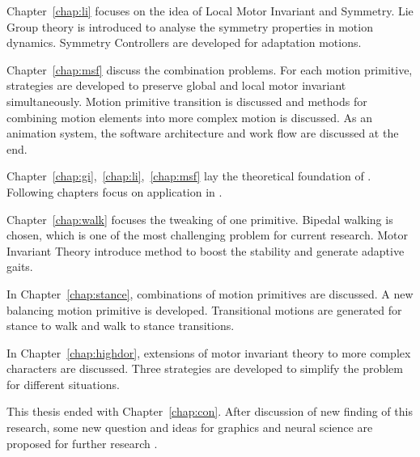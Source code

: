 Chapter~\ref{chap:li} focuses on the idea of Local Motor Invariant and Symmetry.
Lie Group theory is  introduced  to analyse the symmetry properties in motion dynamics.
Symmetry Controllers are developed for adaptation motions.
 


Chapter~\ref{chap:msf} discuss the combination problems.
For each motion primitive,  strategies are developed to preserve global and local motor invariant simultaneously.
Motion primitive transition is discussed and methods for combining motion elements into more complex motion is discussed.
As an animation system, the software architecture and work flow are discussed at the end.

Chapter~\ref{chap:gi},~\ref{chap:li},~\ref{chap:msf} lay the theoretical foundation of \moit.
Following chapters focus on application in \cms.



Chapter~\ref{chap:walk} focuses the tweaking of one primitive.
Bipedal walking is chosen, which is one of the most challenging problem for current \cms research.
Motor Invariant Theory introduce method to boost the stability and generate adaptive gaits.


In Chapter~\ref{chap:stance}, combinations of motion primitives are discussed.
A new balancing motion primitive is developed. 
Transitional motions are generated for stance to walk and walk to stance transitions.

In Chapter~\ref{chap:highdor}, extensions of motor invariant theory to more complex characters are discussed.
Three strategies are developed to simplify the problem for different situations.

This thesis ended with Chapter~\ref{chap:con}. 
After discussion of new finding of this research, some new question and ideas for graphics and neural science are proposed for further research .








